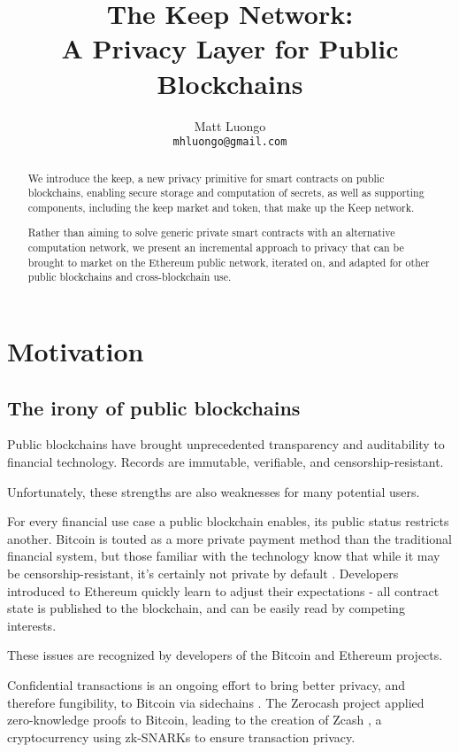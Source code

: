 \documentclass[11pt]{article}
\title{The Keep Network:\protect\\A Privacy Layer for Public Blockchains}
\author{Matt Luongo \\
  {\tt mhluongo@gmail.com}}
\date{}
\begin{document}
 \maketitle \begin{abstract}

  We introduce the keep, a new privacy primitive for smart contracts
  on public blockchains, enabling secure storage and computation of
  secrets, as well as supporting components, including the keep market
  and token, that make up the Keep network.

  Rather than aiming to solve generic private smart contracts with an
  alternative computation network, we present an incremental approach
  to privacy that can be brought to market on the Ethereum public
  network, iterated on, and adapted for other public blockchains and
  cross-blockchain use.

\end{abstract}

\section{Motivation}

\subsection{The irony of public blockchains}

Public blockchains have brought unprecedented transparency and
auditability to financial technology. Records are immutable,
verifiable, and censorship-resistant.

Unfortunately, these strengths are also weaknesses for many potential
users.

For every financial use case a public blockchain enables, its public
status restricts another. Bitcoin is touted as a more private payment
method than the traditional financial system, but those familiar with
the technology know that while it may be censorship-resistant, it’s
certainly not private by default \cite{bitcoinPrivacy}. Developers
introduced to Ethereum quickly learn to adjust their expectations
\cite{ethereumStackexchange}- all contract state is published to the
blockchain, and can be easily read by competing interests.

These issues are recognized by developers of the Bitcoin and Ethereum
projects.

Confidential transactions \cite{confidentialTransactions} is an
ongoing effort to bring better privacy, and therefore fungibility, to
Bitcoin via sidechains \cite{confidentialTransactionsElements}. The
Zerocash project \cite{zerocash} applied zero-knowledge proofs to
Bitcoin, leading to the creation of Zcash \cite{zcash}, a
cryptocurrency using zk-SNARKs to ensure transaction privacy.
\end{document}

